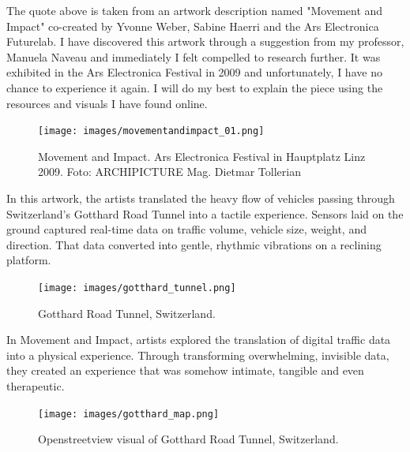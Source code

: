                 The quote above is taken from an artwork description named "Movement and Impact" co-created by Yvonne Weber, Sabine Haerri and the Ars Electronica Futurelab. I have discovered this artwork through a suggestion from my professor, Manuela Naveau and immediately I felt compelled to research further. It was exhibited in the Ars Electronica Festival in 2009 and unfortunately, I have no chance to experience it again. I will do my best to explain the piece using the resources and visuals I have found online.\par

                \begin{figure}[H]
                    \centering
                    \texttt{[image: images/movementandimpact\_01.png]}
                    \caption{Movement and Impact. Ars Electronica Festival in Hauptplatz Linz 2009. Foto: ARCHIPICTURE Mag. Dietmar Tollerian}
                    \label{fig:MOVNIMP}
                \end{figure}   

                In this artwork, the artists translated the heavy flow of vehicles passing through Switzerland's Gotthard Road Tunnel into a tactile experience. Sensors laid on the ground captured real-time data on traffic volume, vehicle size, weight, and direction. That data converted into gentle, rhythmic vibrations on a reclining platform\cite{Movement_and_Impact_ARS}.\par

                \begin{figure}[H]
                    \centering
                    \texttt{[image: images/gotthard\_tunnel.png]}
                    \caption{Gotthard Road Tunnel, Switzerland.}
                    \label{fig:GOTTHARD}
                \end{figure}  

                In Movement and Impact, artists explored the translation of digital traffic data into a physical experience. Through transforming overwhelming, invisible data, they created an experience that was somehow intimate, tangible and even therapeutic.\par

                \begin{figure}[H]
                    \centering
                    \texttt{[image: images/gotthard\_map.png]}
                    \caption{Openstreetview visual of Gotthard Road Tunnel, Switzerland.}
                    \label{fig:GOTTHARD_02}
                \end{figure}  

